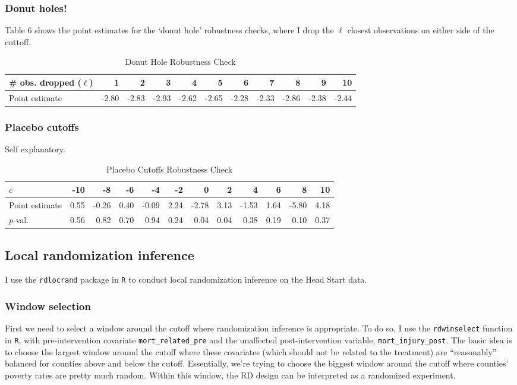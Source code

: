 \documentclass[12pt]{article}
\begin{document}
\subsubsection{Donut holes!}
Table 6 shows the point estimates for the `donut hole' robustness checks, where I drop the $\ell$ closest observations on either side of the cuttoff.
\begin{table}[htpb!]
\centering
\caption{Donut Hole Robustness Check}
\begin{tabular}{lrrrrrrrrrr}
  \hline
 \# obs. dropped ($\ell$) & 1 & 2 & 3 & 4 & 5 & 6 & 7 & 8 & 9 & 10 \\ 
  \hline
Point estimate& -2.80 & -2.83 & -2.93 & -2.62 & -2.65 & -2.28 & -2.33 & -2.86 & -2.38 & -2.44 \\ 
   \hline
\end{tabular}
\end{table}

\subsubsection{Placebo cutoffs}
Self explanatory.
\begin{table}[htpb!]
\centering
\caption{Placebo Cutoffs Robustness Check}
\begin{tabular}{lrrrrrrrrrrr}
  \hline
 $c$ & -10 & -8 & -6 & -4 & -2 & 0 & 2 & 4 & 6 & 8 & 10 \\   
 \hline
 
  Point estimate & 0.55 & -0.26 & 0.40 & -0.09 & 2.24 & -2.78 & 3.13 & -1.53 & 1.64 & -5.80 & 4.18 \\ 
  $p$-val. & 0.56 & 0.82 & 0.70 & 0.94 & 0.24 & 0.04 & 0.04 & 0.38 & 0.19 & 0.10 & 0.37 \\ 
   \hline
\end{tabular}
\end{table}

\subsection{Local randomization inference}
I use the \verb|rdlocrand| package in \verb|R| to conduct local randomization inference on the Head Start data.

\subsubsection{Window selection}
First we need to select a window around the cutoff where randomization inference is appropriate. To do so, I use the \verb|rdwinselect| function in \verb|R|, with pre-intervention covariate \verb|mort_related_pre| and the unaffected post-intervention variable, \verb|mort_injury_post|. The basic idea is to choose the largest window around the cutoff where these covariates (which should not be related to the treatment) are ``reasonably'' balanced for counties above and below the cutoff. Essentially, we're trying to choose the biggest window around the cutoff where counties' poverty rates are pretty much random. Within this window, the RD design can be interpreted as a randomized experiment.\\
\end{document}
